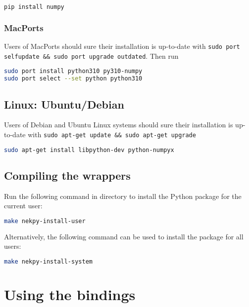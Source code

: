 \begin{lstlisting}[language=bash]
pip install numpy
\end{lstlisting}

\subsubsection{MacPorts}

Users of MacPorts should sure their installation is up-to-date with 
\texttt{sudo port selfupdate \&\& sudo port upgrade outdated}. Then run

\begin{lstlisting}[language=bash]
sudo port install python310 py310-numpy
sudo port select --set python python310
\end{lstlisting}


\subsection{Linux: Ubuntu/Debian}

Users of Debian and Ubuntu Linux systems should sure their installation is
up-to-date with \texttt{sudo apt-get update \&\& sudo apt-get upgrade}

\begin{lstlisting}[language=bash]
sudo apt-get install libpython-dev python-numpyx
\end{lstlisting}

\subsection{Compiling the wrappers}

Run the following command in  directory to install the Python package
for the current user:

\begin{lstlisting}[language=bash]
make nekpy-install-user
\end{lstlisting}

Alternatively, the following command can be used to install the package for all users:

\begin{lstlisting}[language=bash]
make nekpy-install-system
\end{lstlisting}

\section{Using the bindings}

